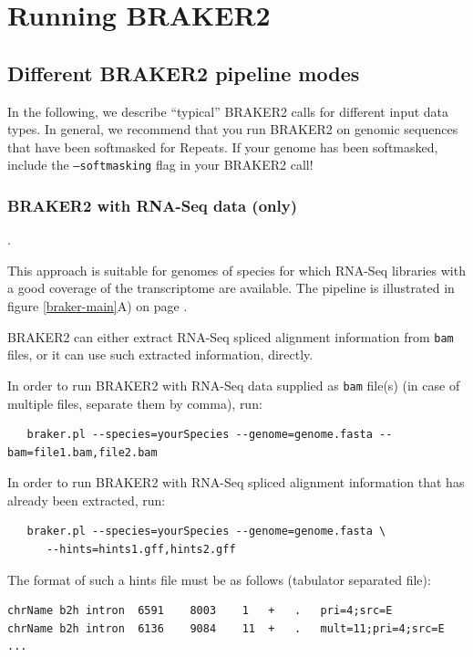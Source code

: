 \documentclass[a4paper,10pt]{report}
\begin{document}
\chapter{Running BRAKER2}

\section{Different BRAKER2 pipeline modes}

In the following, we describe ``typical'' BRAKER2 calls for different input data types. In general, we recommend that you run BRAKER2 on genomic sequences that have been softmasked for Repeats. If your genome has been softmasked, include the \texttt{--softmasking} flag in your BRAKER2 call!

\subsection{BRAKER2 with RNA-Seq data (only)}\label{braker1}.

This approach is suitable for genomes of species for which RNA-Seq libraries with a good coverage of the transcriptome are available. The pipeline is illustrated in figure \ref{braker-main}A) on page \pageref{braker-main}.

BRAKER2 can either extract RNA-Seq spliced alignment information from \texttt{bam} files, or it can use such extracted information, directly.

In order to run BRAKER2 with RNA-Seq data supplied as \texttt{bam} file(s) (in case of multiple files, separate them by comma), run:

\begin{verbatim}
   braker.pl --species=yourSpecies --genome=genome.fasta --bam=file1.bam,file2.bam
\end{verbatim}

In order to run BRAKER2 with RNA-Seq spliced alignment information that has already been extracted, run:

\begin{verbatim}
   braker.pl --species=yourSpecies --genome=genome.fasta \
      --hints=hints1.gff,hints2.gff
\end{verbatim}

The format of such a hints file must be as follows (tabulator separated file):

\begin{verbatim}
chrName	b2h	intron	6591	8003	1	+	.	pri=4;src=E
chrName	b2h	intron	6136	9084	11	+	.	mult=11;pri=4;src=E
...
\end{verbatim}
\end{document}
